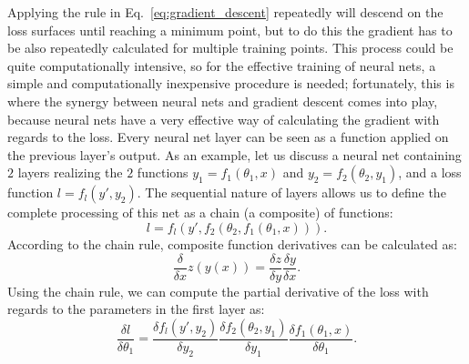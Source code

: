 			Applying the rule in Eq.~\ref{eq:gradient_descent} repeatedly will descend on the loss surfaces until reaching a minimum point, but to do this the gradient has to be also repeatedly calculated for multiple training points.
			This process could be quite computationally intensive, so for the effective training of neural nets, a simple and computationally inexpensive procedure is needed; fortunately, this is where the synergy between neural nets and gradient descent comes into play, because neural nets have a very effective way of calculating the gradient with regards to the loss.
			Every neural net layer can be seen as a function applied on the previous layer's output.
			As an example, let us discuss a neural net containing $2$ layers realizing the $2$ functions $y_1 = f_1(\theta_1, x)$ and $y_2 = f_2(\theta_2, y_1)$, and a loss function $l = f_l(y', y_2)$.
			The sequential nature of layers allows us to define the complete processing of this net as a chain (a composite) of functions:
			\begin{equation}
				l = f_l(y', f_2(\theta_2, f_1(\theta_1, x))).
			\end{equation}
			\noindent According to the chain rule, composite function derivatives can be calculated as:
			\begin{equation}
				\frac{\delta}{\delta{x}}z(y(x)) = \frac{\delta{z}}{\delta{y}}\frac{\delta{y}}{\delta{x}}.
			\end{equation}
			\noindent Using the chain rule, we can compute the partial derivative of the loss with regards to the parameters in the first layer as:
			\begin{equation}
				\label{eq:derivative_chain}
				\frac{\delta{l}}{\delta\theta_1} = \frac{\delta{f_l(y', y_2)}}{\delta{y_2}}\frac{\delta{f_2(\theta_2, y_1)}}{\delta{y_1}}\frac{\delta{f_1(\theta_1, x)}}{\delta{\theta_1}}.
			\end{equation}
			

